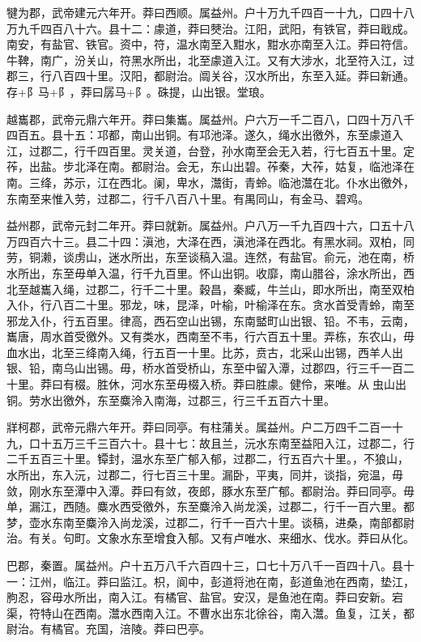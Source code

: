 \documentclass[12pt,UTF8]{ctexbook}
\begin{document}
犍为郡，武帝建元六年开。莽曰西顺。属益州。户十万九千四百一十九，口四十八万九千四百八十六。县十二：豦道，莽曰僰治。江阳，武阳，有铁官，莽曰戢成。南安，有盐官、铁官。资中，符，温水南至入黚水，黚水亦南至入江。莽曰符信。牛鞞，南广，汾关山，符黑水所出，北至豦道入江。又有大涉水，北至符入江，过郡三，行八百四十里。汉阳，都尉治。阘关谷，汉水所出，东至入延。莽曰新通。存+阝马+阝，莽曰孱马+阝。硃提，山出银。堂琅。



越巂郡，武帝元鼎六年开。莽曰集巂。属益州。户六万一千二百八，口四十万八千四百五。县十五：邛都，南山出铜。有邛池泽。遂久，绳水出徼外，东至豦道入江，过郡二，行千四百里。灵关道，台登，孙水南至会无入若，行七百五十里。定莋，出盐。步北泽在南。都尉治。会无，东山出碧。莋秦，大莋，姑复，临池泽在南。三绛，苏示，江在西北。阑，卑水，灊街，青蛉。临池灊在北。仆水出徼外，东南至来惟入劳，过郡二，行千八百八十里。有禺同山，有金马、碧鸡。



益州郡，武帝元封二年开。莽曰就新。属益州。户八万一千九百四十六，口五十八万四百六十三。县二十四：滇池，大泽在西，滇池泽在西北。有黑水祠。双柏，同劳，铜濑，谈虏山，迷水所出，东至谈稿入温。连然，有盐官。俞元，池在南，桥水所出，东至毋单入温，行千九百里。怀山出铜。收靡，南山腊谷，涂水所出，西北至越巂入绳，过郡二，行千二十里。穀昌，秦臧，牛兰山，即水所出，南至双柏入仆，行八百二十里。邪龙，味，昆泽，叶榆，叶榆泽在东。贪水首受青蛉，南至邪龙入仆，行五百里。律高，西石空山出锡，东南盢町山出银、铅。不韦，云南，巂唐，周水首受徼外。又有类水，西南至不韦，行六百五十里。弄栋，东农山，毋血水出，北至三绛南入绳，行五百一十里。比苏，贲古，北采山出锡，西羊人出银、铅，南乌山出锡。毋，桥水首受桥山，东至中留入潭，过郡四，行三千一百二十里。莽曰有棳。胜休，河水东至毋棳入桥。莽曰胜豦。健伶，来唯。从虫山出铜。劳水出徼外，东至麋泠入南海，过郡三，行三千五百六十里。



牂柯郡，武帝元鼎六年开。莽曰同亭。有柱蒲关。属益州。户二万四千二百一十九，口十五万三千三百六十。县十七：故且兰，沅水东南至益阳入江，过郡二，行二千五百三十里。镡封，温水东至广郁入郁，过郡二，行五百六十里。，不狼山，水所出，东入沅，过郡二，行七百三十里。漏卧，平夷，同并，谈指，宛温，毋敛，刚水东至潭中入潭。莽曰有敛，夜郎，豚水东至广郁。都尉治。莽曰同亭。毋单，漏江，西随。麋水西受徼外，东至麋泠入尚龙溪，过郡二，行千一百六里。都梦，壶水东南至麋泠入尚龙溪，过郡二，行千一百六十里。谈稿，进桑，南部都尉治。有关。句町。文象水东至增食入郁。又有卢唯水、来细水、伐水。莽曰从化。



巴郡，秦置。属益州。户十五万八千六百四十三，口七十万八千一百四十八。县十一：江州，临江。莽曰监江。枳，阆中，彭道将池在南，彭道鱼池在西南，垫江，朐忍，容毋水所出，南入江。有橘官、盐官。安汉，是鱼池在南。莽曰安新。宕渠，符特山在西南。灊水西南入江。不曹水出东北徐谷，南入灊。鱼复，江关，都尉治。有橘官。充国，涪陵。莽曰巴亭。
\end{document}
